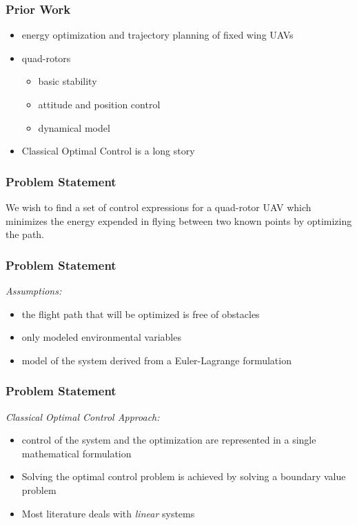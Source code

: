 \documentclass{beamer}
\begin{document}

\begin{frame}
\frametitle{Prior Work}
\begin{itemize}
\item energy optimization and trajectory planning of fixed wing UAVs
\item quad-rotors
	\begin{itemize}
		\item basic stability
		\item attitude and position control
        \item dynamical model
    \end{itemize}
\item Classical Optimal Control is a long story
\end{itemize}
\end{frame}


\begin{frame}
\frametitle{Problem Statement}

We wish to find a set of control expressions for a quad-rotor UAV which minimizes the energy expended in flying between two known points by optimizing the path.
\end{frame}

\begin{frame}
\frametitle{Problem Statement}
\textit{Assumptions:}
\begin{itemize}
\item the flight path that will be optimized is free of obstacles
\item only modeled environmental variables
\item model of the system derived from a Euler-Lagrange formulation
\end{itemize}
\end{frame}

\begin{frame}
\frametitle{Problem Statement}

\textit{Classical Optimal Control Approach:}

\begin{itemize}
	\item control of the system and the optimization are represented in a single mathematical formulation
	\item Solving the optimal control problem is achieved by solving a boundary value problem
      \item Most literature deals with \textit{linear} systems
\end{itemize}

\end{frame}
\end{document}
